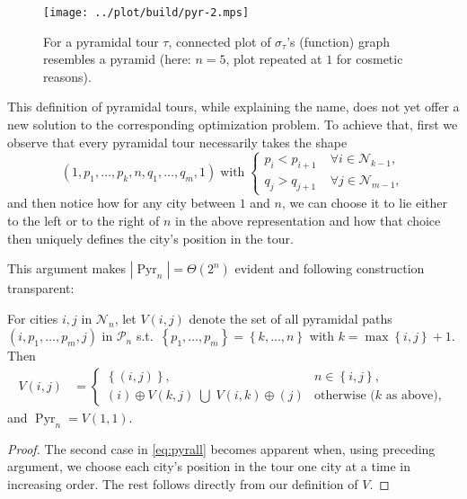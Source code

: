 \documentclass[titlepage,twoside,index=totoc,bibliography=totoc]{scrartcl}
\numberwithin{equation}{section}
\numberwithin{figure}{section}
\numberwithin{table}{section}
\begin{document}
\begin{figure}[bht]
  \centering
  \texttt{[image: ../plot/build/pyr-2.mps]}
  \caption{%
    For a pyramidal tour $\tau$, connected plot of $\sigma_\tau$'s
    (function) graph resembles a pyramid (here: $n = 5$, plot repeated at $1$
    for cosmetic reasons).
  }
\end{figure}

This definition of pyramidal tours, while explaining the name, does not yet
offer a new solution to the corresponding optimization problem.  To achieve
that, first we observe that every pyramidal tour necessarily takes the
shape
\[
\left(1, p_1, \ldots, p_k, n, q_1, \ldots, q_m, 1 \right)
\; \text{with} \;
\begin{cases}
  p_i < p_{i+1} \; & \forall i \in \mathcal{N}_{k-1},\\
  q_j > q_{j+1} \; & \forall j \in \mathcal{N}_{m-1},
\end{cases}
\]
and then notice how for any city between $1$ and $n$,
we can choose it to lie either to the left or to the right of $n$ in the above representation
and how that choice then uniquely defines the city's position in the tour.

This argument makes $\left|\operatorname{Pyr}_n\right| = \Theta\left(2^n\right)$
evident and following construction transparent:

\begin{proposition}
\label{prop:pyrall}
  For cities $i,j$ in $\mathcal{N}_n$,
  let $V\!\left(i,j\right)$ denote the set of all pyramidal paths
  $\left(i,p_1,\ldots,p_m,j\right)$
  in $\mathcal{P}_n$
  s.t.\ $\left\{p_1,\ldots,p_m\right\} = \left\{k,\ldots,n\right\}$
  with $k = \max\left\{i,j\right\}+1$.  Then
  \begin{align}
    \label{eq:pyrall}
    V\!\left(i,j\right) & =
    \begin{cases}
      \left\{\left(i,j\right)\right\}, & n \in \left\{i,j\right\},
      \\
      \left(i\right) \oplus V\!\left(k,j\right)
      \;\bigcup\;
      V\!\left(i,k\right) \oplus \left(j\right)
      & \text{otherwise ($k$ as above)},
    \end{cases}
  \end{align}
  and $\operatorname{Pyr}_n = V\!\left(1,1\right)$.
\end{proposition}
\begin{proof}
  The second case in \cref{eq:pyrall} becomes apparent when, using
  preceding argument, we choose each city's position in the tour one city
  at a time in increasing order.  The rest follows directly from our
  definition of $V$.
\end{proof}
\end{document}
